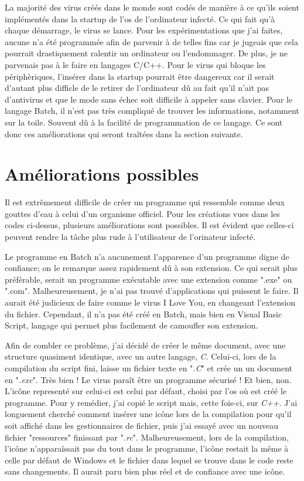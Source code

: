 \medskip

La majorité des virus créés dans le monde sont codés de manière à ce qu'ils soient implémentés dans la startup de l'os de l'ordinateur infecté. Ce qui fait qu'à chaque démarrage, le virus se lance. Pour les expérimentations que j'ai faites, aucune n'a été programmée afin de parvenir à de telles fins car je jugeais que cela pourrait drastiquement ralentir un ordinateur ou l'endommager. De plus, je ne parvenais pas à le faire en langages C/C++. Pour le virus qui bloque les périphèriques, l'insérer dans la startup pourrait être dangereux car il serait d'autant plus difficle de le retirer de l'ordinateur dû au fait qu'il n'ait pas d'antivirus et que le mode sans échec soit difficile à appeler sans clavier. Pour le langage Batch, il n'est pas très compliqué de trouver les informations, notamment sur la toile. Souvent dû à la facilité de programmation de ce langage. Ce sont donc ces améliorations qui seront traîtées dans la section suivante.



    
\section{Améliorations possibles}

Il est extrêmement difficile de créer un programme qui ressemble comme deux gouttes d'eau à celui d'un organisme officiel. Pour les créations vues dans les codes ci-dessus, plusieurs améliorations sont possibles. Il est évident que celles-ci peuvent rendre la tâche plus rude à l'utilisateur de l'orinateur infecté.

Le programme en Batch n'a aucunement l'apparence d'un programme digne de confiance; on le remarque assez rapidement dû à son extension. Ce qui serait plus préférable, serait un programme exécutable avec une extension comme ".exe" ou ".com". Malheureusement, je n'ai pas trouvé d'applications qui puissent le faire. Il aurait été judicieux de faire comme le virus I Love You, en changeant l'extension du fichier. Cependant, il n'a pas été créé en Batch, mais bien en Visual Basic Script, langage qui permet plus facilement de camoufler son extension.

Afin de combler ce problème, j'ai décidé de créer le même document, avec une structure quasiment identique, avec un autre langage, \textit{C}. Celui-ci, lors de la compilation du script fini, laisse un fichier texte en "\textit{.C}" et crée un un document en "\textit{.exe}". 
Très bien ! Le virus paraît être un programme sécurisé !
Et bien, non. L'icône representé sur celui-ci est celui par défaut, choisi par l'os où est créé le programme. Pour y remédier, j'ai copié le script mais, cette fois-ci, sur \textit{C++}. J'ai longuement cherché comment insérer une icône lors de la compilation pour qu'il soit affiché dans les gestionnaires de fichier, puis j'ai essayé avec un nouveau fichier "ressources" finissant par "\textit{.rc}". Malheureusement, lors de la compilation, l'icône n'apparaîssait pas du tout dans le programme, l'icône restait la même à celle par défaut de Windows et le fichier dans lequel se trouve dans le code reste sans changements. Il aurait paru bien plus réel et de confiance avec une icône.

